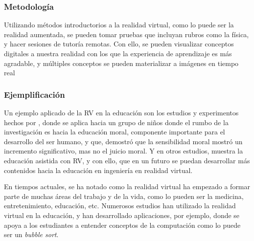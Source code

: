 



\subsubsection{Metodología}
Utilizando métodos introductorios a la realidad virtual, como lo puede ser la realidad aumentada, se pueden tomar pruebas que incluyan rubros como la física, y hacer sesiones de tutoría remotas. Con ello, se pueden visualizar conceptos digitales a nuestra realidad con los que la experiencia de aprendizaje es m\'as agradable, y múltiples conceptos se pueden materializar a imágenes en tiempo real \parencite{RADU2023100011}

\subsubsection{Ejemplificación}

Un ejemplo aplicado de la RV en la educación son los estudios y experimentos hechos por \textcite{SHIM2023100010}, donde se aplica hacia un grupo de niños donde el rumbo de la investigación es hacia la educación moral, componente importante para el desarrollo del ser humano, y que, demostró que la sensibilidad moral mostró un incremento significativo, mas no el juicio moral. Y en otros estudios, \textcite{OJE2023100033} muestra la educaci{\'o}n asistida con RV, y con ello, que en un futuro se puedan desarrollar m{\'a}s contenidos hacia la educaci{\'o}n en ingenier{\'i}a en realidad virtual.

En tiempos actuales, se ha notado como la realidad virtual ha empezado a formar parte de muchas áreas del trabajo y de la vida, como lo pueden ser la medicina, entretenimiento, educación, etc. Numerosos estudios han utilizado la realidad virtual en la educación, y han desarrollado aplicaciones, por ejemplo, donde se apoya a los estudiantes a entender conceptos de la computación como lo puede ser un \textit{bubble sort}. \parencite{OYELERE2023100016} 

